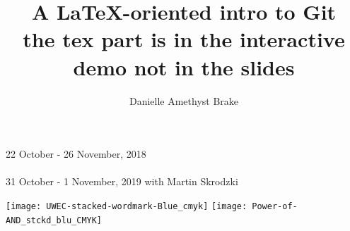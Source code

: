 \documentclass[14pt,aspectratio=1610]{beamer} %
\title[Git @ ICERM \hspace{2.5in} Brake]{A \LaTeX-oriented intro to Git \\  \small the tex part is in the interactive demo not in the slides}
\author{Danielle Amethyst Brake}
\date{}
\begin{document}


\begin{frame}

 \titlepage
 
 \begin{center}
\end{center}

\vspace{-1.5in}
\small
22 October - 26 November, 2018 \\  \\31 October - 1 November, 2019 with Martin Skrodzki \\ 


  \texttt{[image: UWEC-stacked-wordmark-Blue\_cmyk]}
\hfill
 \texttt{[image: Power-of-AND\_stckd\_blu\_CMYK]}

\end{frame}


\end{document}

